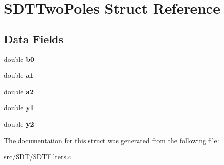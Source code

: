 \hypertarget{struct_s_d_t_two_poles}{}\section{S\+D\+T\+Two\+Poles Struct Reference}
\label{struct_s_d_t_two_poles}
\subsection*{Data Fields}
\begin{DoxyCompactItemize}
\item 
\hypertarget{struct_s_d_t_two_poles_a798947bd96f7e2615d107b383cc4b9c6}{}double {\bfseries b0}\label{struct_s_d_t_two_poles_a798947bd96f7e2615d107b383cc4b9c6}

\item 
\hypertarget{struct_s_d_t_two_poles_a5d015a3751aec61f2442b957cb6f517a}{}double {\bfseries a1}\label{struct_s_d_t_two_poles_a5d015a3751aec61f2442b957cb6f517a}

\item 
\hypertarget{struct_s_d_t_two_poles_ac55c2d269ed76bd9bdb7fb25f3533a4e}{}double {\bfseries a2}\label{struct_s_d_t_two_poles_ac55c2d269ed76bd9bdb7fb25f3533a4e}

\item 
\hypertarget{struct_s_d_t_two_poles_ac3b72e5b77595ca2340ecf8ccfe5fd99}{}double {\bfseries y1}\label{struct_s_d_t_two_poles_ac3b72e5b77595ca2340ecf8ccfe5fd99}

\item 
\hypertarget{struct_s_d_t_two_poles_a5347e514ebe985fb371754ffd2b5ff83}{}double {\bfseries y2}\label{struct_s_d_t_two_poles_a5347e514ebe985fb371754ffd2b5ff83}

\end{DoxyCompactItemize}


The documentation for this struct was generated from the following file\+:\begin{DoxyCompactItemize}
\item 
src/\+S\+D\+T/S\+D\+T\+Filters.\+c\end{DoxyCompactItemize}
